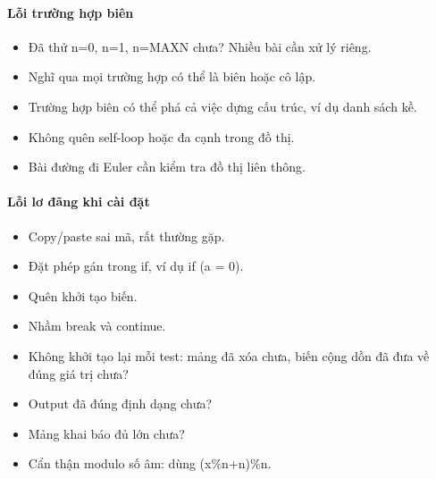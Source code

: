 \documentclass[11pt]{article}
\begin{document}
\paragraph{Lỗi trường hợp biên}\begin{itemize}

\item Đã thử n=0, n=1, n=MAXN chưa? Nhiều bài cần xử lý riêng.

\item Nghĩ qua mọi trường hợp có thể là biên hoặc cô lập.

\item Trường hợp biên có thể phá cả việc dựng cấu trúc, ví dụ danh sách kề.

\item Không quên self-loop hoặc đa cạnh trong đồ thị.

\item Bài đường đi Euler cần kiểm tra đồ thị liên thông.

\end{itemize}

\paragraph{Lỗi lơ đãng khi cài đặt}\begin{itemize}

\item Copy/paste sai mã, rất thường gặp.

\item Đặt phép gán trong if, ví dụ if (a = 0).

\item Quên khởi tạo biến.

\item Nhầm break và continue.

\item Không khởi tạo lại mỗi test: mảng đã xóa chưa, biến cộng dồn đã đưa về đúng giá trị chưa?

\item Output đã đúng định dạng chưa?

\item Mảng khai báo đủ lớn chưa?

\item Cẩn thận modulo số âm: dùng (x\%n+n)\%n.

\end{itemize}
\end{document}
